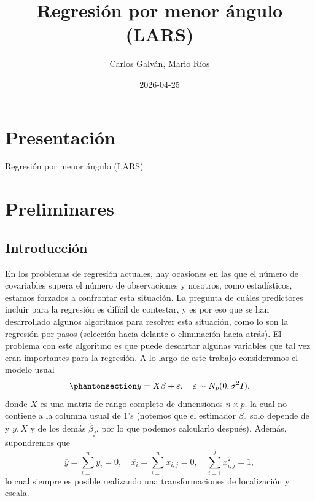 \documentclass[
  letterpaper,
  DIV=11,
  numbers=noendperiod]{scrreprt}
\title{Regresión por menor ángulo (LARS)}
\author{Carlos Galván, Mario Ríos}
\date{2026-04-25}
\renewcommand*\contentsname{Tabla de contenidos}
\newcommand\contentsname{Tabla de contenidos}
\theoremstyle{plain}
\theoremstyle{definition}
\theoremstyle{remark}
\begin{document}
\maketitle

\renewcommand*\contentsname{Tabla de contenidos}
{
\hypersetup{linkcolor=}
\setcounter{tocdepth}{2}
\tableofcontents
}


\chapter*{Presentación}\label{presentaciuxf3n}


Regresión por menor ángulo (LARS)


\chapter{Preliminares}\label{preliminares}

\section{Introducción}\label{introducciuxf3n}

En los problemas de regresión actuales, hay ocasiones en las que el
número de covariables supera el número de observaciones y nosotros, como
estadísticos, estamos forzados a confrontar esta situación. La pregunta
de cuáles predictores incluir para la regresión es difícil de contestar,
y es por eso que se han desarrollado algunos algoritmos para resolver
esta situación, como lo son la regresión por pasos (selección hacia
delante o eliminación hacia atrás). El problema con este algoritmo es
que puede descartar algunas variables que tal vez eran importantes para
la regresión. A lo largo de este trabajo consideramos el modelo usual
\begin{equation}\phantomsection\label{eq-modelo}{
y= X\beta+\varepsilon,\quad \varepsilon \sim N_p(0,\sigma^2I),
}\end{equation} donde \(X\) es una matriz de rango completo de
dimensiones \(n\times p\). la cual no contiene a la columna usual de 1's
(notemos que el estimador \(\hat\beta_0\) solo depende de y \(y, X\) y
de los demás \(\hat \beta_j\), por lo que podemos calcularlo después).
Además, supondremos que \[
\overline y=\sum_{i=1}^n y_i=0,\quad  \overline{x_i}=\sum_{i=1}^nx_{i,j}=0,\quad \sum_{i=1}^jx_{i,j}^2=1,
\] lo cual siempre es posible realizando una transformaciones de
localización y escala.
\end{document}
